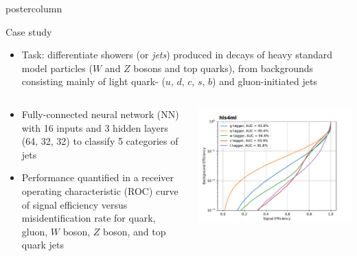 \documentclass[final,hyperref={pdfpagelabels=false}]{beamer}
\begin{document}
\begin{frame}
\begin{columns}
\begin{column}{.49\textwidth}
\begin{beamercolorbox}[center,wd=\textwidth]{postercolumn}
\begin{minipage}[T]{.95\textwidth}
{            \begin{block}{Case study}
              \begin{itemize}
              \item Task: differentiate showers (or \emph{jets})
                produced in decays of heavy standard model
                particles ($W$ and $Z$ bosons and top quarks),
                from backgrounds consisting mainly of light quark-
                ($u$, $d$, $c$, $s$, $b$) and gluon-initiated jets 
                \end{itemize}
              \begin{columns}              
              \begin{column}{.49\textwidth}
                \begin{itemize}
              \item Fully-connected neural network (NN) with 16 inputs and 3 hidden
                layers (64, 32, 32) to classify 5 categories of jets
              \item Performance quantified in a receiver operating
                characteristic (ROC) curve of signal efficiency versus
                misidentification rate for quark, gluon, $W$ boson,
                $Z$ boson, and top quark jets
              \end{itemize}
            \end{column}
            \begin{column}{.49\textwidth}
             \begin{center}
                    \includegraphics[width=\linewidth]{roc-32bit.pdf}
                  \end{center}

\end{column}
\end{columns}
\end{block}}
\end{minipage}
\end{beamercolorbox}
\end{column}
\end{columns}
\end{frame}
\end{document}
